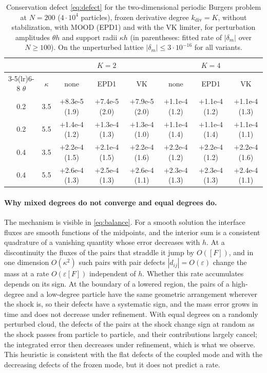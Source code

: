 \documentclass[11pt,a4paper]{article}
\numberwithin{equation}{section}
\begin{document}
\begin{table}[!htbp]
\centering
\caption{Conservation defect \eqref{eq:defect} for the two-dimensional periodic Burgers problem at $N=200$ ($4\cdot10^4$ particles), frozen derivative degree $k_{\mathrm{div}}=K$, without stabilization, with MOOD (EPD1) and with the VK limiter, for perturbation amplitudes $\theta h$ and support radii $\kappa h$ (in parentheses: fitted rate of $|\delta_m|$ over $N\ge100$). On the unperturbed lattice $|\delta_m|\le3\cdot10^{-16}$ for all variants.}\label{tab:mass_2d}
\footnotesize
\setlength{\tabcolsep}{3.5pt}
\begin{tabular}{cccccccc}
\toprule
& & \multicolumn{3}{c}{$K=2$} & \multicolumn{3}{c}{$K=4$}\\
\cmidrule(lr){3-5}\cmidrule(lr){6-8}
$\theta$ & $\kappa$ & none & EPD1 & VK & none & EPD1 & VK\\
\midrule
0.2 & 3.5 & $+$8.3e-5 (1.9) & $+$7.4e-5 (2.0) & $+$7.9e-5 (2.0) & $+$1.1e-4 (1.2) & $+$1.1e-4 (1.2) & $+$1.1e-4 (1.3)\\
0.2 & 5.5 & $+$1.4e-4 (1.2) & $+$1.3e-4 (1.3) & $+$1.3e-4 (1.0) & $+$1.1e-4 (1.4) & $+$1.1e-4 (1.4) & $+$1.1e-4 (1.1)\\
0.4 & 3.5 & $+$2.2e-4 (1.5) & $+$2.1e-4 (1.5) & $+$2.2e-4 (1.6) & $+$2.2e-4 (1.2) & $+$2.2e-4 (1.2) & $+$2.2e-4 (1.6)\\
0.4 & 5.5 & $+$2.6e-4 (1.3) & $+$2.5e-4 (1.3) & $+$2.6e-4 (1.1) & $+$2.3e-4 (1.3) & $+$2.3e-4 (1.3) & $+$2.4e-4 (1.1)\\
\bottomrule
\end{tabular}
\end{table}

\paragraph{Why mixed degrees do not converge and equal degrees do.} The mechanism is visible in \eqref{eq:balance}. For a smooth solution the interface fluxes are smooth functions of the midpoints, and the interior sum is a consistent quadrature of a vanishing quantity whose error decreases with $h$. At a discontinuity the fluxes of the pairs that straddle it jump by $O([F])$, and in one dimension $O(\kappa^2)$ such pairs with pair defects $|d_{ij}|=O(\varepsilon)$ change the mass at a rate $O(\varepsilon[F])$ independent of $h$. Whether this rate accumulates depends on its sign. At the boundary of a lowered region, the pairs of a high-degree and a low-degree particle have the same geometric arrangement wherever the shock is, so their defects have a systematic sign, and the mass error grows in time and does not decrease under refinement. With equal degrees on a randomly perturbed cloud, the defects of the pairs at the shock change sign at random as the shock passes from particle to particle, and their contributions largely cancel; the integrated error then decreases under refinement, which is what we observe. This heuristic is consistent with the flat defects of the coupled mode and with the decreasing defects of the frozen mode, but it does not predict a rate.
\end{document}
